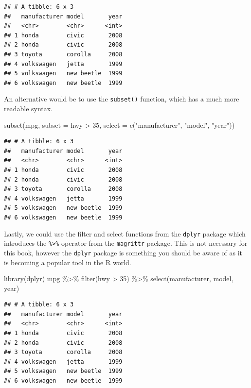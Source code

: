 \documentclass[
]{book}
\newenvironment{Shaded}{\begin{snugshade}}{\end{snugshade}}
\newcommand{\AttributeTok}[1]{\textcolor[rgb]{0.77,0.63,0.00}{#1}}
\newcommand{\DecValTok}[1]{\textcolor[rgb]{0.00,0.00,0.81}{#1}}
\newcommand{\FunctionTok}[1]{\textcolor[rgb]{0.00,0.00,0.00}{#1}}
\newcommand{\NormalTok}[1]{#1}
\newcommand{\SpecialCharTok}[1]{\textcolor[rgb]{0.00,0.00,0.00}{#1}}
\newcommand{\StringTok}[1]{\textcolor[rgb]{0.31,0.60,0.02}{#1}}
\theoremstyle{definition}
\theoremstyle{definition}
\theoremstyle{definition}
\theoremstyle{definition}
\theoremstyle{remark}
\begin{document}
\begin{verbatim}
## # A tibble: 6 x 3
##   manufacturer model       year
##   <chr>        <chr>      <int>
## 1 honda        civic       2008
## 2 honda        civic       2008
## 3 toyota       corolla     2008
## 4 volkswagen   jetta       1999
## 5 volkswagen   new beetle  1999
## 6 volkswagen   new beetle  1999
\end{verbatim}

An alternative would be to use the \texttt{subset()} function, which has a much more readable syntax.

\begin{Shaded}
\begin{Highlighting}[]
\FunctionTok{subset}\NormalTok{(mpg, }\AttributeTok{subset =}\NormalTok{ hwy }\SpecialCharTok{\textgreater{}} \DecValTok{35}\NormalTok{, }\AttributeTok{select =} \FunctionTok{c}\NormalTok{(}\StringTok{"manufacturer"}\NormalTok{, }\StringTok{"model"}\NormalTok{, }\StringTok{"year"}\NormalTok{))}
\end{Highlighting}
\end{Shaded}

\begin{verbatim}
## # A tibble: 6 x 3
##   manufacturer model       year
##   <chr>        <chr>      <int>
## 1 honda        civic       2008
## 2 honda        civic       2008
## 3 toyota       corolla     2008
## 4 volkswagen   jetta       1999
## 5 volkswagen   new beetle  1999
## 6 volkswagen   new beetle  1999
\end{verbatim}

Lastly, we could use the filter and select functions from the \texttt{dplyr} package which introduces the \texttt{\%\textgreater{}\%} operator from the \texttt{magrittr} package. This is not necessary for this book, however the \texttt{dplyr} package is something you should be aware of as it is becoming a popular tool in the R world.

\begin{Shaded}
\begin{Highlighting}[]
\FunctionTok{library}\NormalTok{(dplyr)}
\NormalTok{mpg }\SpecialCharTok{\%\textgreater{}\%} \FunctionTok{filter}\NormalTok{(hwy }\SpecialCharTok{\textgreater{}} \DecValTok{35}\NormalTok{) }\SpecialCharTok{\%\textgreater{}\%} \FunctionTok{select}\NormalTok{(manufacturer, model, year)}
\end{Highlighting}
\end{Shaded}

\begin{verbatim}
## # A tibble: 6 x 3
##   manufacturer model       year
##   <chr>        <chr>      <int>
## 1 honda        civic       2008
## 2 honda        civic       2008
## 3 toyota       corolla     2008
## 4 volkswagen   jetta       1999
## 5 volkswagen   new beetle  1999
## 6 volkswagen   new beetle  1999
\end{verbatim}
\end{document}

